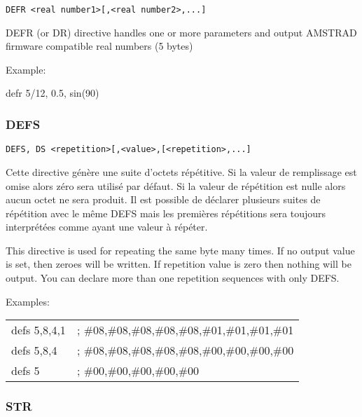 \begin{xen}
\begin{verbatim}
DEFR <real number1>[,<real number2>,...]
\end{verbatim}

DEFR (or DR) directive handles one or more parameters and output AMSTRAD firmware compatible real numbers (5 bytes)
\end{xen}

Example:
\begin{code}
defr 5/12, 0.5, sin(90)
\end{code}

\subsubsection{DEFS}

\begin{verbatim}
DEFS, DS <repetition>[,<value>,[<repetition>,...]
\end{verbatim}

\begin{xfr}
Cette directive génère une suite d'octets répétitive. Si la valeur de remplissage est omise alors zéro sera utilisé par défaut. Si la valeur de répétition est nulle alors aucun octet ne sera produit. Il est possible de déclarer plusieurs suites de répétition avec le même DEFS mais les premières répétitions sera toujours interprétées comme ayant une valeur à répéter.
\end{xfr}

\begin{xen}
This directive is used for repeating the same byte many times.
If no output value is set, then zeroes will be written.
If repetition value is zero then nothing will be output.
You can declare more than one repetition sequences with only DEFS.
\end{xen}

Examples:
\begin{code}
\begin{tabular}{ll}
defs 5,8,4,1 &; \#08,\#08,\#08,\#08,\#08,\#01,\#01,\#01,\#01 \\
defs 5,8,4   &; \#08,\#08,\#08,\#08,\#08,\#00,\#00,\#00,\#00 \\
defs 5       &; \#00,\#00,\#00,\#00,\#00
\end{tabular}
\end{code}


\subsubsection{STR}

